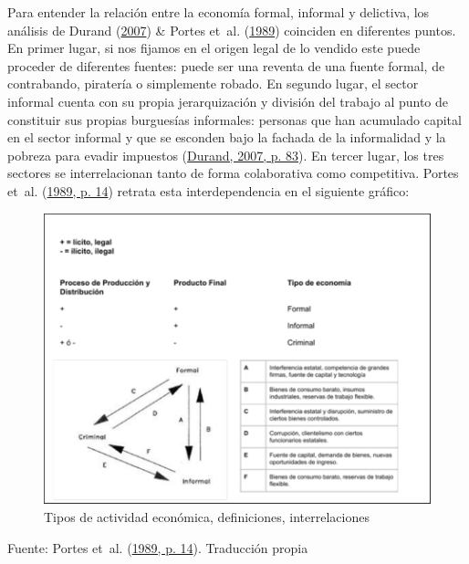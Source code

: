 \documentclass[
  letterpaper,
  12pt,
  oneside,
  spanish,
  doublespacing,
  headsepline,
  parskip]{MastersDoctoralThesis}
\begin{document}
Para entender la relación entre la economía formal, informal y
delictiva, los análisis de Durand
(\protect\hyperlink{ref-durand2007}{2007}) \& Portes et~al.
(\protect\hyperlink{ref-theinfo1989}{1989}) coinciden en diferentes
puntos. En primer lugar, si nos fijamos en el origen legal de lo vendido
este puede proceder de diferentes fuentes: puede ser una reventa de una
fuente formal, de contrabando, piratería o simplemente robado. En
segundo lugar, el sector informal cuenta con su propia jerarquización y
división del trabajo al punto de constituir sus propias burguesías
informales: personas que han acumulado capital en el sector informal y
que se esconden bajo la fachada de la informalidad y la pobreza para
evadir impuestos (\protect\hyperlink{ref-durand2007}{Durand, 2007, p.
83}). En tercer lugar, los tres sectores se interrelacionan tanto de
forma colaborativa como competitiva. Portes et~al.
(\protect\hyperlink{ref-theinfo1989}{1989, p. 14}) retrata esta
interdependencia en el siguiente gráfico:

\begin{figure}

\caption{\label{fig-esquema}Tipos de actividad económica, definiciones,
interrelaciones}

{\centering \includegraphics[width=5.20833in,height=\textheight]{Chapters/../Figures/portes_informal.pdf}

}

\end{figure}

\noindent \small Fuente: Portes et~al.
(\protect\hyperlink{ref-theinfo1989}{1989, p. 14}). Traducción propia
\normalsize
\end{document}
